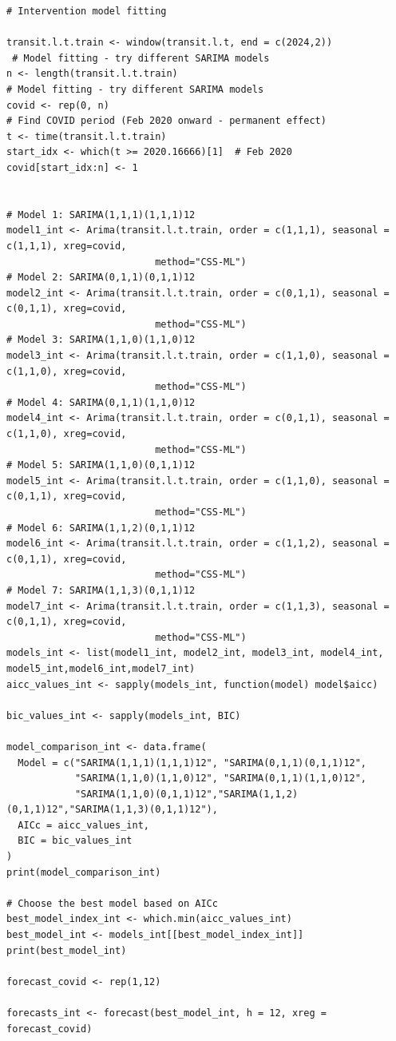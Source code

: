 \documentclass[11pt]{article}
\begin{document}
{\begin{verbatim}
# Intervention model fitting

transit.l.t.train <- window(transit.l.t, end = c(2024,2))
 # Model fitting - try different SARIMA models
n <- length(transit.l.t.train)
# Model fitting - try different SARIMA models
covid <- rep(0, n)
# Find COVID period (Feb 2020 onward - permanent effect)
t <- time(transit.l.t.train)
start_idx <- which(t >= 2020.16666)[1]  # Feb 2020
covid[start_idx:n] <- 1


# Model 1: SARIMA(1,1,1)(1,1,1)12
model1_int <- Arima(transit.l.t.train, order = c(1,1,1), seasonal = c(1,1,1), xreg=covid,
                          method="CSS-ML")
# Model 2: SARIMA(0,1,1)(0,1,1)12
model2_int <- Arima(transit.l.t.train, order = c(0,1,1), seasonal = c(0,1,1), xreg=covid,
                          method="CSS-ML")
# Model 3: SARIMA(1,1,0)(1,1,0)12
model3_int <- Arima(transit.l.t.train, order = c(1,1,0), seasonal = c(1,1,0), xreg=covid,
                          method="CSS-ML")
# Model 4: SARIMA(0,1,1)(1,1,0)12
model4_int <- Arima(transit.l.t.train, order = c(0,1,1), seasonal = c(1,1,0), xreg=covid,
                          method="CSS-ML")
# Model 5: SARIMA(1,1,0)(0,1,1)12
model5_int <- Arima(transit.l.t.train, order = c(1,1,0), seasonal = c(0,1,1), xreg=covid,
                          method="CSS-ML")
# Model 6: SARIMA(1,1,2)(0,1,1)12
model6_int <- Arima(transit.l.t.train, order = c(1,1,2), seasonal = c(0,1,1), xreg=covid,
                          method="CSS-ML")
# Model 7: SARIMA(1,1,3)(0,1,1)12
model7_int <- Arima(transit.l.t.train, order = c(1,1,3), seasonal = c(0,1,1), xreg=covid,
                          method="CSS-ML")
models_int <- list(model1_int, model2_int, model3_int, model4_int, model5_int,model6_int,model7_int)
aicc_values_int <- sapply(models_int, function(model) model$aicc)

bic_values_int <- sapply(models_int, BIC)

model_comparison_int <- data.frame(
  Model = c("SARIMA(1,1,1)(1,1,1)12", "SARIMA(0,1,1)(0,1,1)12",
            "SARIMA(1,1,0)(1,1,0)12", "SARIMA(0,1,1)(1,1,0)12",
            "SARIMA(1,1,0)(0,1,1)12","SARIMA(1,1,2)(0,1,1)12","SARIMA(1,1,3)(0,1,1)12"),
  AICc = aicc_values_int,
  BIC = bic_values_int
)
print(model_comparison_int)

# Choose the best model based on AICc
best_model_index_int <- which.min(aicc_values_int)
best_model_int <- models_int[[best_model_index_int]]
print(best_model_int)

forecast_covid <- rep(1,12)

forecasts_int <- forecast(best_model_int, h = 12, xreg = forecast_covid)


\end{verbatim}}
\end{document}
